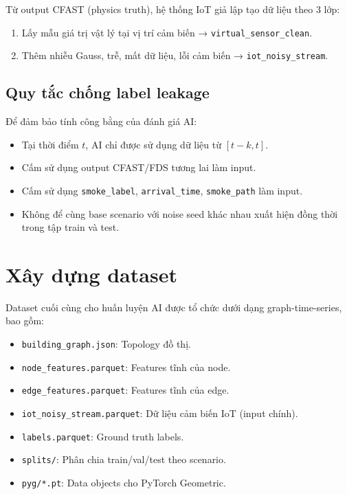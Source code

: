 Từ output CFAST (physics truth), hệ thống IoT giả lập tạo dữ liệu theo 3 lớp:

\begin{enumerate}
  \item Lấy mẫu giá trị vật lý tại vị trí cảm biến → \texttt{virtual\_sensor\_clean}.
  \item Thêm nhiễu Gauss, trễ, mất dữ liệu, lỗi cảm biến → \texttt{iot\_noisy\_stream}.
\end{enumerate}

\subsection{Quy tắc chống label leakage}

Để đảm bảo tính công bằng của đánh giá AI:
\begin{itemize}
  \item Tại thời điểm $t$, AI chỉ được sử dụng dữ liệu từ $[t-k, t]$.
  \item Cấm sử dụng output CFAST/FDS tương lai làm input.
  \item Cấm sử dụng \texttt{smoke\_label}, \texttt{arrival\_time}, \texttt{smoke\_path} làm input.
  \item Không để cùng base scenario với noise seed khác nhau xuất hiện đồng thời trong tập train và test.
\end{itemize}

\section{Xây dựng dataset}
\label{sec:dataset}

Dataset cuối cùng cho huấn luyện AI được tổ chức dưới dạng graph-time-series, bao gồm:
\begin{itemize}
  \item \texttt{building\_graph.json}: Topology đồ thị.
  \item \texttt{node\_features.parquet}: Features tĩnh của node.
  \item \texttt{edge\_features.parquet}: Features tĩnh của edge.
  \item \texttt{iot\_noisy\_stream.parquet}: Dữ liệu cảm biến IoT (input chính).
  \item \texttt{labels.parquet}: Ground truth labels.
  \item \texttt{splits/}: Phân chia train/val/test theo scenario.
  \item \texttt{pyg/*.pt}: Data objects cho PyTorch Geometric.
\end{itemize}

